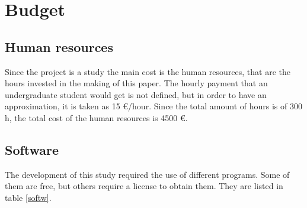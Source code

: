 
\setlength{\parindent}{0pt}

\usepackage{epigraph}
\usepackage{tocloft}
\usepackage{mathcomp}
\usepackage{subcaption}

\usepackage{multicol}
\usepackage[T1]{fontenc}
\usepackage{titlesec, blindtext, color}
\newcommand{\hsp}{\hspace{20pt}}
\titleformat{\chapter}[hang]{\Huge\bfseries}{\thechapter\hsp\textcolor{gray75}{|}\hsp}{0pt}{\Huge\bfseries}


\renewcommand{\familydefault}{\sfdefault}



\newpage\thispagestyle{EmptyPage}


\setcounter{tocdepth}{3}
\tableofcontents
\pagebreak

\renewcommand{\cfttabnumwidth}{4em}
\listoftables
\pagebreak


\newpage
{}

\newpage
\setlength{\parskip}{1em}

\chapter{Budget}

\section{Human resources}
Since the project is a study the main cost is the human resources, that are the hours invested in the making of this paper. The hourly payment that an undergraduate student would get is not defined, but in order to have an approximation, it is taken as 15 €/hour. Since the total amount of hours is of 300 h, the total cost of the human resources is 4500 €.

\section{Software}
The development of this study required the use of different programs. Some of them are free, but others require a license to obtain them. They are listed in table \ref{softw}.

